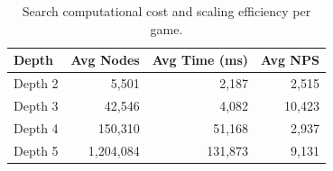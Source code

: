 \begin{table}[htbp]
\centering
\caption[Search Computational Cost and Scaling Efficiency]{Search computational cost and scaling efficiency per game.}
\label{tab:search_cost}
\begin{tabularx}{\textwidth}{Xrrr}
\toprule
\textbf{Depth} & \textbf{Avg Nodes} & \textbf{Avg Time (ms)} & \textbf{Avg NPS} \\

\midrule
Depth 2 & 5,501   & 2,187   & 2,515 \\
Depth 3 & 42,546  & 4,082   & 10,423 \\
Depth 4 & 150,310 & 51,168  & 2,937 \\
Depth 5 & 1,204,084 & 131,873 & 9,131 \\
\bottomrule
\end{tabularx}
\end{table}


